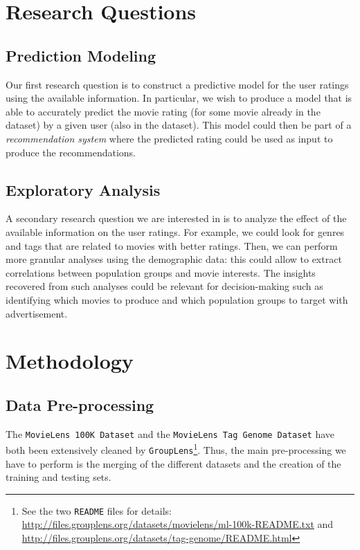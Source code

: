 \documentclass[bj, preprint]{imsart}
\begin{document}
\section{Research Questions}\label{sec:questions}

\subsection{Prediction Modeling}

Our first research question is to construct a predictive model for the user ratings using the available information. 
In particular, we wish to produce a model that is able to accurately predict the movie rating (for some movie already in the dataset) by a given user (also in the dataset). 
This model could then be part of a \textit{recommendation system} where the predicted rating could be used as input to produce the recommendations.

\subsection{Exploratory Analysis}

A secondary research question we are interested in is to analyze the effect of the available information on the user ratings. 
For example, we could look for genres and tags that are related to movies with better ratings. 
Then, we can perform more granular analyses using the demographic data: this could allow to extract correlations between population groups and movie interests. 
The insights recovered from such analyses could be relevant for decision-making such as identifying which movies to produce and which population groups to target with advertisement.

\section{Methodology}\label{sec:method}

\subsection{Data Pre-processing}\label{subsec:method.preprocess}

The \texttt{MovieLens 100K Dataset} and the \texttt{MovieLens Tag Genome Dataset} have both been extensively cleaned by \texttt{GroupLens}\footnote{See the two \texttt{README} files for details: \url{http://files.grouplens.org/datasets/movielens/ml-100k-README.txt} and \url{http://files.grouplens.org/datasets/tag-genome/README.html}}. 
Thus, the main pre-processing we have to perform is the merging of the different datasets and the creation of the training and testing sets.
\end{document}
